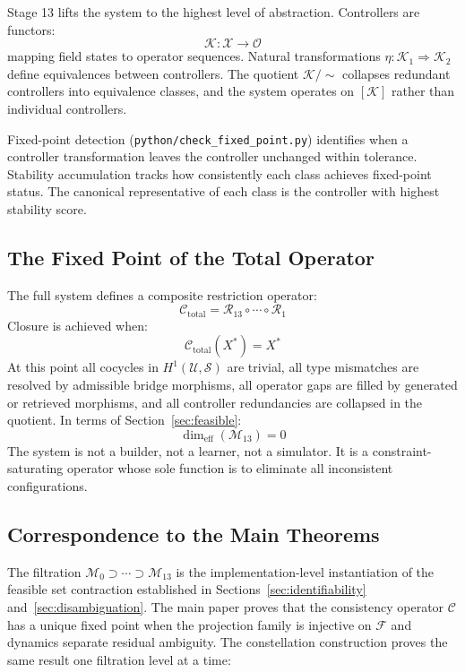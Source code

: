 \documentclass[12pt, oneside]{article}
\begin{document}
Stage 13 lifts the system to the highest level of abstraction. Controllers are functors:
\[
\mathcal{K} : \mathcal{X} \to \mathcal{O}
\]
mapping field states to operator sequences. Natural transformations $\eta : \mathcal{K}_1
\Rightarrow \mathcal{K}_2$ define equivalences between controllers. The quotient
$\mathcal{K}/{\sim}$ collapses redundant controllers into equivalence classes, and the
system operates on $[\mathcal{K}]$ rather than individual controllers.

Fixed-point detection (\texttt{python/check\_fixed\_point.py}) identifies when a
controller transformation leaves the controller unchanged within tolerance. Stability
accumulation tracks how consistently each class achieves fixed-point status. The
canonical representative of each class is the controller with highest stability score.

\subsection{The Fixed Point of the Total Operator}

The full system defines a composite restriction operator:
\[
\mathcal{C}_{\mathrm{total}} = \mathcal{R}_{13} \circ \cdots \circ \mathcal{R}_1
\]
Closure is achieved when:
\[
\mathcal{C}_{\mathrm{total}}(X^*) = X^*
\]
At this point all cocycles in $H^1(\mathcal{U}, \mathcal{S})$ are trivial, all type
mismatches are resolved by admissible bridge morphisms, all operator gaps are filled by
generated or retrieved morphisms, and all controller redundancies are collapsed in the
quotient. In terms of Section~\ref{sec:feasible}:
\[
\dim_{\mathrm{eff}}(\mathcal{M}_{13}) = 0
\]
The system is not a builder, not a learner, not a simulator. It is a
constraint-saturating operator whose sole function is to eliminate all inconsistent
configurations.

\subsection{Correspondence to the Main Theorems}

The filtration $\mathcal{M}_0 \supset \cdots \supset \mathcal{M}_{13}$ is the
implementation-level instantiation of the feasible set contraction established in
Sections~\ref{sec:identifiability} and~\ref{sec:disambiguation}. The main paper proves
that the consistency operator $\mathcal{C}$ has a unique fixed point when the projection
family is injective on $\mathcal{F}$ and dynamics separate residual ambiguity. The
constellation construction proves the same result one filtration level at a time:
\end{document}
